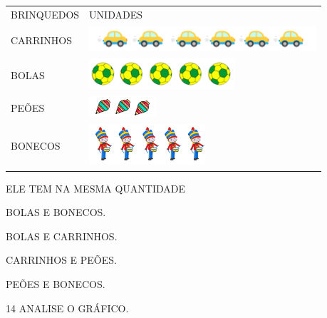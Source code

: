 \begin{longtable}[]{@{}ll@{}}
\toprule
BRINQUEDOS & UNIDADES\tabularnewline
CARRINHOS &
\includegraphics[width=3.32338in,height=0.38547in]{media/image129.png}\tabularnewline
BOLAS &
\includegraphics[width=2.12138in,height=0.44045in]{media/image132.png}\tabularnewline
PEÕES &
\includegraphics[width=0.97976in,height=0.30538in]{media/image134.png}\tabularnewline
BONECOS &
\includegraphics[width=1.70172in,height=0.60128in]{media/image135.png}\tabularnewline
\bottomrule
\end{longtable}

ELE TEM NA MESMA QUANTIDADE

\begin{escolha}
\item BOLAS E BONECOS.

\item BOLAS E CARRINHOS.

\item CARRINHOS E PEÕES.

\item PEÕES E BONECOS.
\end{escolha}


\num{14} ANALISE O GRÁFICO.


